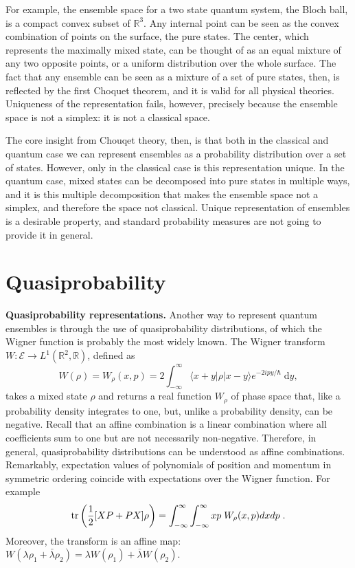 \documentclass[10pt,twocolumn, nofootinbib]{revtex4-2}
\newcommand{\Ens}[1][E] {\mathcal{#1}} %
\begin{document}
For example, the ensemble space for a two state quantum system, the Bloch ball, is a compact convex subset of $\mathbb{R}^3$. Any internal point can be seen as the convex combination of points on the surface, the pure states. The center, which represents the maximally mixed state, can be thought of as an equal mixture of any two opposite points, or a uniform distribution over the whole surface. The fact that any ensemble can be seen as a mixture of a set of pure states, then, is reflected by the first Choquet theorem, and it is valid for all physical theories. Uniqueness of the representation fails, however, precisely because the ensemble space is not a simplex: it is not a classical space.

The core insight from Chouqet theory, then, is that both in the classical and quantum case we can represent ensembles as a probability distribution over a set of states. However, only in the classical case is this representation unique. In the quantum case, mixed states can be decomposed into pure states in multiple ways, and it is this multiple decomposition that makes the ensemble space not a simplex, and therefore the space not classical. Unique representation of ensembles is a desirable property, and standard probability measures are not going to provide it in general.

\section{Quasiprobability}

\textbf{Quasiprobability representations.} Another way to represent quantum ensembles is through the use of quasiprobability distributions, of which the Wigner function is probably the most widely known. The Wigner transform $W : \Ens \to L^1(\mathbb{R}^2, \mathbb{R}) $, defined as \cite[eq.~11.8-3a]{mandel1995}
\begin{equation}
	W(\rho) = W_{\rho} (x, p) = 2 \int_{-\infty}^{\infty} \langle x + y | \rho | x - y \rangle e^{-2 i p y / \hbar} \; \mathrm dy,
\end{equation}
takes a mixed state $\rho$ and returns a real function $W_{\rho}$ of phase space that, like a probability density integrates to one, but, unlike a probability density, can be negative. Recall that an affine combination is a linear combination where all coefficients sum to one but are not necessarily non-negative. Therefore, in general, quasiprobability distributions can be understood as affine combinations. Remarkably, expectation values of polynomials of position and momentum in symmetric ordering coincide with expectations over the Wigner function. For example
\begin{equation}
	\operatorname{tr} \left( \frac{1}{2}[XP+PX] \rho \right) = \int_{-\infty}^{\infty} \int_{-\infty}^{\infty} xp \; W_{\rho} (x, p) dx dp \; .
\end{equation}
Moreover, the transform is an affine map: $W(\lambda \rho_1 + \bar{\lambda} \rho_2 ) = \lambda W(\rho_1) + \bar{\lambda} W(\rho_2)$.
\end{document}
